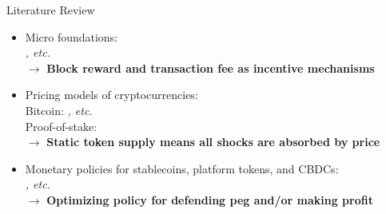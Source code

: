 \documentclass{beamer}
\begin{document}
\begin{frame}{Literature Review}
    \begin{itemize}
        \item Micro foundations:\\
        {\footnotesize \textit{\citet{nisan2007algorithmic, budish2018economic, biais2019blockchain, gans2019more, gans2022mechanism, huberman2021monopoly}, etc.}}\\
        $\rightarrow$ \textbf{Block reward and transaction fee as incentive mechanisms}

        \item Pricing models of cryptocurrencies:\\
        {\footnotesize Bitcoin: \textit{\citet{athey2016bitcoin, garratt2018bitcoin, schilling2019some, schilling2019currency, catalini2020some, biais2023equilibrium, bolt2020value, hinzen2022bitcoin, chiu2017economics}, etc.}}\\
        {\footnotesize Proof-of-stake: \textit{\citet{catalini2020markets, saleh2019volatility, saleh2021blockchain}}}\\
        $\rightarrow$ \textbf{Static token supply means all shocks are absorbed by price}
        \item Monetary policies for stablecoins, platform tokens, and CBDCs:\\
        {\footnotesize \textit{\citet{cong2021tokenomics, cong2022token, cong2022staking, d2022can, fernandez2021central, zhu2019framework, sockin2023model, sockin2023decentralization}, etc.}}\\
        $\rightarrow$ \textbf{Optimizing policy for defending peg and/or making profit}
    \end{itemize}
\end{frame}
\end{document}

